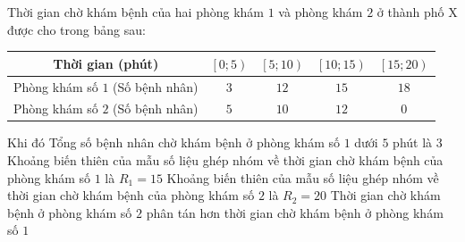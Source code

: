 \begin{ex}%
	Thời gian chờ khám bệnh của hai phòng khám $1$ và phòng khám $2$ ở thành phố X được cho  trong bảng sau:
	\begin{center}
		\begin{tabular}{|c|c|c|c|c|}
			\hline 
			Thời gian  (phút) & $\left[0;5\right)$ & $\left[5;10\right)$ & $\left[10;15\right)$ & $\left[15;20\right)$ \\
			\hline 
			Phòng khám số $1$ \newline (Số bệnh nhân) & $3$  & $12$ & $15$ & $18$ \\
			 \hline
			Phòng  khám số $2$ \newline (Số bệnh nhân) & $5$ & $10 $& $12$ & $0$ \\
			\hline 
		\end{tabular}
	\end{center}
	 Khi đó
	\choiceTF 
		{\True Tổng số bệnh nhân chờ khám bệnh ở phòng khám số $1$ dưới $5$ phút là $3$} 
		{Khoảng  biến thiên của mẫu số liệu ghép nhóm về thời gian chờ khám bệnh của phòng khám số $1$ là $R_1=15$}
		{Khoảng biến thiên của mẫu số liệu ghép nhóm về thời gian  chờ khám bệnh của phòng khám số $2$ là $R_2=20$}
		{Thời gian chờ khám bệnh ở phòng khám số $2$ phân tán hơn thời gian chờ khám bệnh ở phòng khám số $1$} 
\end{ex}



